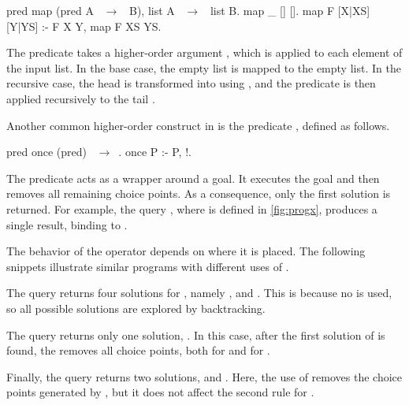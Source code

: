 \begin{elpicode}
pred map (pred A ~$\to$~ B), list A ~$\to$~ list B.
map _ [] [].
map F [X|XS] [Y|YS] :- F X Y, map F XS YS.
\end{elpicode}

The predicate takes a
higher-order argument , which is applied to each element of the input
list. In the base case, the empty list is mapped to the empty list. In the
recursive case, the head  is transformed into  using , and the
predicate is then applied recursively to the tail .

Another common higher-order construct in \elpi is the predicate
, defined as follows.
%
\begin{elpicode}
pred once (pred) ~$\to$~.
once P :- P, !.
\end{elpicode}

The predicate  acts as a wrapper around a goal. It executes the goal
 and then removes all remaining choice points. As a consequence, only the
first solution is returned. For example, the query , where
 is defined in \cref{fig:progx}, produces a single result, binding
 to .

The behavior of the \cut operator depends on where it is placed. The
following snippets illustrate similar programs with different uses of \cut.

\mvspace
\noindent
\begin{minipage}{0.33\textwidth}
  
\end{minipage}
\begin{minipage}{0.33\textwidth}
  
\end{minipage}
\begin{minipage}{0.33\textwidth}
  
\end{minipage}
\mvspace

The query  returns four solutions for , namely
, and . This is because no \cut is used, so all possible
solutions are explored by backtracking.

The query  returns only one solution, . In this case,
after the first solution of  is found, the \cut removes all choice
points, both for  and for .

Finally, the query  returns two solutions,  and
. Here, the use of  removes the choice points generated by
, but it does not affect the second rule for .

